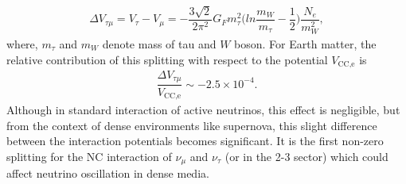 	\begin{align}
		\Delta V_{\tau\mu}=V_\tau-V_\mu=-\dfrac{3\sqrt{2}}{2\pi^2}G_Fm^2_\tau\bigg(ln \dfrac{m_W}{m_\tau} -\dfrac{1}{2}\bigg)\dfrac{N_e}{m^2_W},
		\label{eq:Higher_MSW_analysis}
	\end{align}
	where, $m_\tau$ and $m_W$ denote mass of tau and $W$ boson. For Earth matter, the relative contribution of this splitting with respect to the potential $V_{\text{CC,e}}$ is
	\begin{align}
		\dfrac{\Delta V_{\tau\mu}}{V_{\text{CC,e}}}\sim -2.5\times10^{-4}.
	\end{align}
	Although in standard interaction of active neutrinos, this effect is negligible, but from the context of dense environments like supernova, this slight difference between the interaction potentials becomes significant. It is the first non-zero splitting for the NC interaction of $\nu_\mu$ and $\nu_\tau$ (or in the 2-3 sector) which could affect neutrino oscillation in dense media.
	
